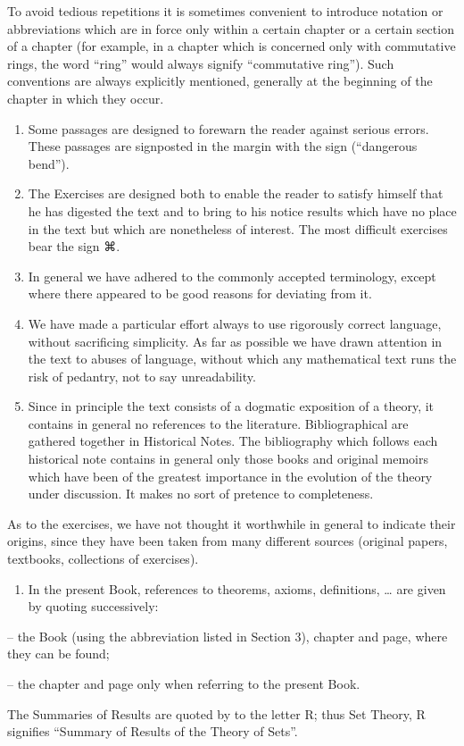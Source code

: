To avoid tedious repetitions it is sometimes convenient to introduce notation or abbreviations which are in force only within a certain chapter or a certain section of a chapter (for example, in a chapter which is concerned only with commutative rings, the word ``ring'' would always signify ``commutative ring''). Such conventions are always explicitly mentioned, generally at the beginning of the chapter in which they occur.

\begin{enumerate}
\def\labelenumi{\arabic{enumi}.}
\setcounter{enumi}{5}
\item
  Some passages are designed to forewarn the reader against serious errors. These passages are signposted in the margin with the sign (``dangerous bend'').
\item
  The Exercises are designed both to enable the reader to satisfy himself that he has digested the text and to bring to his notice results which have no place in the text but which are nonetheless of interest. The most difficult exercises bear the sign ⌘.
\item
  In general we have adhered to the commonly accepted terminology, except where there appeared to be good reasons for deviating from it.
\item
  We have made a particular effort always to use rigorously correct language, without sacrificing simplicity. As far as possible we have drawn attention in the text to abuses of language, without which any mathematical text runs the risk of pedantry, not to say unreadability.
\item
  Since in principle the text consists of a dogmatic exposition of a theory, it contains in general no references to the literature. Bibliographical are gathered together in Historical Notes. The bibliography which follows each historical note contains in general only those books and original memoirs which have been of the greatest importance in the evolution of the theory under discussion. It makes no sort of pretence to completeness.
\end{enumerate}

As to the exercises, we have not thought it worthwhile in general to indicate their origins, since they have been taken from many different sources (original papers, textbooks, collections of exercises).

\begin{enumerate}
\def\labelenumi{\arabic{enumi}.}
\setcounter{enumi}{10}
\tightlist
\item
  In the present Book, references to theorems, axioms, definitions, \ldots{} are given by quoting successively:
\end{enumerate}

-- the Book (using the abbreviation listed in Section 3), chapter and page, where they can be found;

-- the chapter and page only when referring to the present Book.

The Summaries of Results are quoted by to the letter R; thus Set Theory, R signifies ``Summary of Results of the Theory of Sets''.
